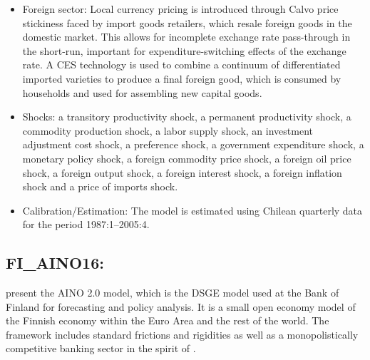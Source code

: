 \documentclass[11pt,a4paper]{article}
\begin{document}
\begin{itemize}
		\item Foreign sector: Local currency pricing is introduced through  Calvo price stickiness faced by import goods retailers, which resale foreign goods in the domestic market. This allows for incomplete exchange rate pass-through in the short-run, important for expenditure-switching effects of the exchange rate. A CES technology is used to combine a continuum of differentiated imported varieties to produce a final foreign good, which is consumed by households and used for assembling new capital goods.
		
		\item Shocks: a transitory productivity shock, a permanent productivity shock, a commodity production shock, a labor supply shock, an investment adjustment cost shock, a preference shock, a government expenditure shock, a monetary policy shock, a foreign commodity price shock, a foreign oil price shock, a foreign output shock, a foreign interest shock, a foreign inflation shock and a price of imports shock.
		
		\item Calibration/Estimation: The model is estimated using Chilean quarterly data for the period 1987:1--2005:4.
		
		
	\end{itemize}
	
	
	\subsection{FI\_AINO16: \cite{kilponen2016aino}}
	\label{FIAINO16}
	\cite{kilponen2016aino} present the AINO 2.0 model, which is the DSGE model used at the Bank of Finland for forecasting and policy analysis. It is a small open economy model of the Finnish economy within the Euro Area and the rest of the world. The framework includes standard frictions and rigidities as well as a monopolistically competitive banking sector in the spirit of \cite{Geralietal2010}. 
	
\end{document}
